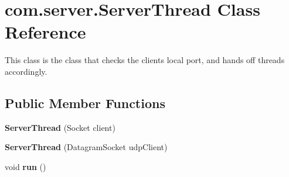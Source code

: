 \hypertarget{classcom_1_1server_1_1ServerThread}{\section{com.\-server.\-Server\-Thread Class Reference}
\label{classcom_1_1server_1_1ServerThread}
}


This class is the class that checks the clients local port, and hands off threads accordingly.  


\subsection*{Public Member Functions}
\begin{DoxyCompactItemize}
\item 
\hypertarget{classcom_1_1server_1_1ServerThread_a7394c023583e8949b69cf664fe61539a}{{\bfseries Server\-Thread} (Socket client)}\label{classcom_1_1server_1_1ServerThread_a7394c023583e8949b69cf664fe61539a}

\item 
\hypertarget{classcom_1_1server_1_1ServerThread_acb48783d33cdc7b6ba983964b75de4a7}{{\bfseries Server\-Thread} (Datagram\-Socket udp\-Client)}\label{classcom_1_1server_1_1ServerThread_acb48783d33cdc7b6ba983964b75de4a7}

\item 
\hypertarget{classcom_1_1server_1_1ServerThread_a27a2a717d36ba29a5e6159ddf2bb8157}{void {\bfseries run} ()}\label{classcom_1_1server_1_1ServerThread_a27a2a717d36ba29a5e6159ddf2bb8157}

\end{DoxyCompactItemize}
